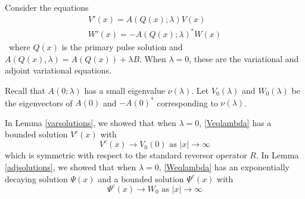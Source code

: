 \documentclass[thesis.tex]{subfiles}
\begin{document}
Consider the equations
\begin{align}
V'(x) = A(Q(x); \lambda) V(x) \label{Veqlambda} \\
W'(x) = -A(Q(x); \lambda)^* W(x) \label{Weqlambda}
\end{align}\
where $Q(x)$ is the primary pulse solution and $A(Q(x), \lambda) = A(Q(x)) + \lambda B$. When $\lambda = 0$, these are the variational and adjoint variational equations.

Recall that $A(0; \lambda)$ has a small eigenvalue $\nu(\lambda)$. Let $V_0(\lambda)$ and $W_0(\lambda)$ be the eigenvectors of $A(0)$ and $-A(0)^*$ corresponding to $\nu(\lambda)$. 

In Lemma \ref{varsolutions}, we showed that when $\lambda = 0$, \eqref{Veqlambda} has a bounded solution $V^c(x)$ with
\[
V^c(x) \rightarrow V_0(0) \text{ as }|x| \rightarrow \infty
\]
which is symmetric with respect to the standard reversor operator $R$. In Lemma \ref{adjsolutions}, we showed that when $\lambda = 0$, \eqref{Weqlambda} has an exponentially decaying solution $\Psi(x)$ and a bounded solution $\Psi^c(x)$ with 
\[
\Psi^c(x) \rightarrow W_0 \text{ as }|x| \rightarrow \infty
\]
\end{document}
